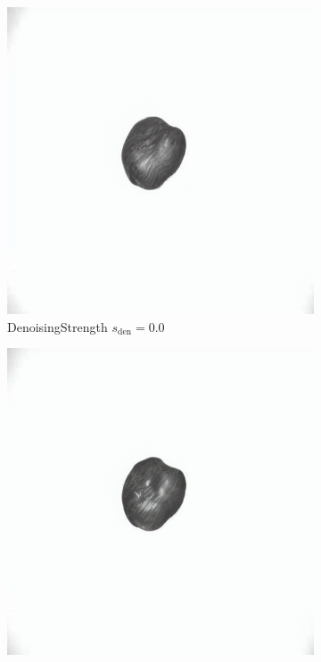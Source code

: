 \documentclass[12pt,DIV14,BCOR12mm,a4paper,footinclude=false,headinclude,parskip=half-,twoside,openright,cleardoublepage=empty,toc=index,bibliography=totoc,listof=totoc]{scrreprt}
\numberwithin{equation}{chapter}
\begin{document}
\begin{figure}
\begin{subfigure}[t]{0.23\textwidth}
        \includegraphics[width=\linewidth]{../media/image_0.0.png} %
        \caption{Denoising\hspace{0.2em}Strength $s_{\text{den}} = 0.0$}
    \end{subfigure}
    \begin{subfigure}[t]{0.23\textwidth} %
        \centering
        \includegraphics[width=\linewidth]{../media/image_0.1.png} %

\end{subfigure}
\end{figure}
\end{document}
